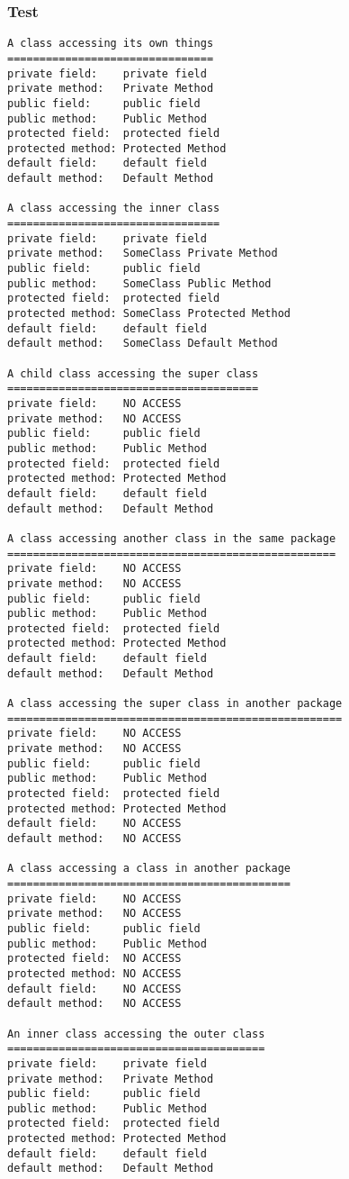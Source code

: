 \subsubsection{Test}\label{App:AppendixKResults}
\begin{lstlisting}
A class accessing its own things
================================
private field:    private field
private method:   Private Method
public field:     public field
public method:    Public Method
protected field:  protected field
protected method: Protected Method
default field:    default field
default method:   Default Method

A class accessing the inner class
=================================
private field:    private field
private method:   SomeClass Private Method
public field:     public field
public method:    SomeClass Public Method
protected field:  protected field
protected method: SomeClass Protected Method
default field:    default field
default method:   SomeClass Default Method

A child class accessing the super class
=======================================
private field:    NO ACCESS 
private method:   NO ACCESS 
public field:     public field
public method:    Public Method
protected field:  protected field
protected method: Protected Method
default field:    default field
default method:   Default Method

A class accessing another class in the same package
===================================================
private field:    NO ACCESS 
private method:   NO ACCESS 
public field:     public field
public method:    Public Method
protected field:  protected field
protected method: Protected Method
default field:    default field
default method:   Default Method

A class accessing the super class in another package
====================================================
private field:    NO ACCESS 
private method:   NO ACCESS 
public field:     public field
public method:    Public Method
protected field:  protected field
protected method: Protected Method
default field:    NO ACCESS 
default method:   NO ACCESS 

A class accessing a class in another package
============================================
private field:    NO ACCESS 
private method:   NO ACCESS 
public field:     public field
public method:    Public Method
protected field:  NO ACCESS
protected method: NO ACCESS
default field:    NO ACCESS 
default method:   NO ACCESS 

An inner class accessing the outer class
========================================
private field:    private field
private method:   Private Method
public field:     public field
public method:    Public Method
protected field:  protected field
protected method: Protected Method
default field:    default field
default method:   Default Method

\end{lstlisting}